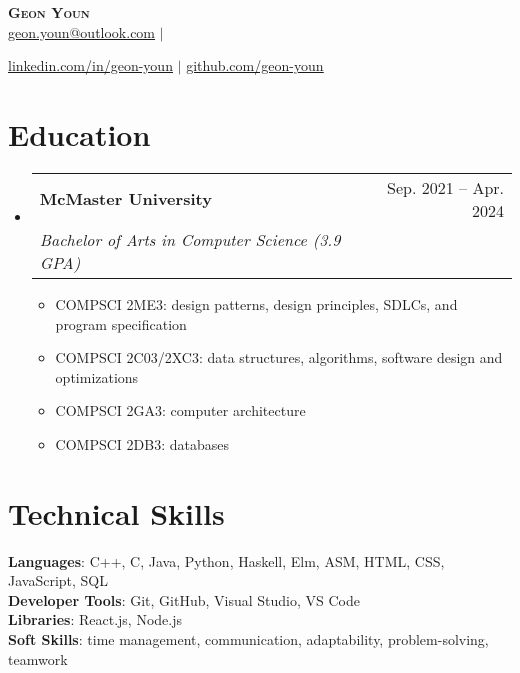 \documentclass[letterpaper,11pt]{article}
\makeatletter
\newcommand{\resumeItem}[1]{
	\item\small{
		{#1 \vspace{-2pt}}
	}
}
\newcommand{\resumeSubheading}[4]{
	\vspace{-2pt}\item
	\begin{tabular*}{0.97\textwidth}[t]{l@{\extracolsep{\fill}}r}
		\textbf{#1} & #2 \\
		\textit{\small#3} & \textit{\small #4} \\
	\end{tabular*}\vspace{-7pt}
}
\newcommand{\resumeSubHeadingListStart}{\begin{itemize}[leftmargin=0.15in,
			label={}]}
\newcommand{\resumeSubHeadingListEnd}{\end{itemize}}
\newcommand{\resumeItemListStart}{\begin{itemize}}
\newcommand{\resumeItemListEnd}{\end{itemize}\vspace{-5pt}}
\makeatother
\begin{document}
\begin{center}
	\textbf{\Huge \scshape Geon Youn} \\ \vspace{1pt}
	\small
	\href{mailto:geon.youn@outlook.com}{\underline{geon.youn@outlook.com}}
	$|$

	\href{https://linkedin.com/in/geon-youn}{\underline{linkedin.com/in/geon-youn}}
	$|$
	\href{https://github.com/geon-youn}{\underline{github.com/geon-youn}}
\end{center}

\section{Education}
\resumeSubHeadingListStart
\resumeSubheading
{McMaster University}{Sep. 2021 -- Apr. 2024}
{Bachelor of Arts in Computer Science (3.9 GPA)}{}
\resumeItemListStart
\resumeItem{COMPSCI 2ME3: design patterns, design principles,
	SDLCs, and program specification}
\resumeItem{COMPSCI 2C03/2XC3: data structures, algorithms,
	software design and optimizations}
\resumeItem{COMPSCI 2GA3: computer architecture}
\resumeItem{COMPSCI 2DB3: databases}
\resumeItemListEnd
\resumeSubHeadingListEnd

\section{Technical Skills}
\begin{itemize}[leftmargin=0.15in, label={}]
	\small{\item{
		            \textbf{Languages}{: C++, C, Java, Python, Haskell,
			            Elm, ASM,
			            HTML, CSS, JavaScript, SQL} \\
		            \textbf{Developer Tools}{: Git, GitHub, Visual
			            Studio, VS
			            Code} \\
		            \textbf{Libraries}{:
			            React.js,
			            Node.js} \\
		            \textbf{Soft Skills}{: time management,
			            communication, adaptability,
			            problem-solving, teamwork}
		      }}
\end{itemize}

%
\end{document}
